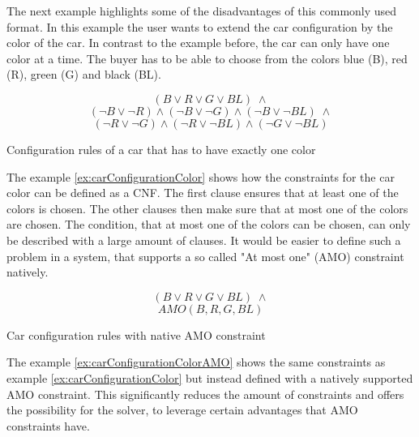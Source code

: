 The next example highlights some of the disadvantages of this commonly used format. In this example the user wants to extend the car configuration by the color of the car. In contrast to the example before, the car can only have one color at a time. The buyer has to be able to choose from the colors blue (B), red (R), green (G) and black (BL).
\begin{example}
\begin{leftbar}
\begin{displaymath}
(B \vee R \vee G \vee BL) \; \wedge
\end{displaymath}
\begin{displaymath}
(\neg B \vee \neg R) \wedge (\neg B \vee \neg G) \wedge (\neg B \vee \neg BL)\; \wedge
\end{displaymath}
\begin{displaymath}
(\neg R \vee \neg G) \wedge (\neg R \vee \neg BL) \wedge (\neg G \vee \neg BL)
\end{displaymath}
\end{leftbar}
\caption{Configuration rules of a car that has to have exactly one color}
\label{ex:carConfigurationColor}
\end{example}

The example \ref{ex:carConfigurationColor} shows how the constraints for the car color can be defined as a CNF. The first clause ensures that at least one of the colors is chosen. The other clauses then make sure that at most one of the colors are chosen. The condition, that at most one of the colors can be chosen, can only be described with a large amount of clauses. It would be easier to define such a problem in a system, that supports a so called "At most one" (AMO) constraint natively.

\begin{example}
\begin{leftbar}
\begin{displaymath}
(B \vee R \vee G \vee BL) \; \wedge
\end{displaymath}
\begin{displaymath}
AMO(B,R,G,BL)
\end{displaymath}
\end{leftbar}
\caption{Car configuration rules with native AMO constraint}
\label{ex:carConfigurationColorAMO}
\end{example}

The example \ref{ex:carConfigurationColorAMO} shows the same constraints as example \ref{ex:carConfigurationColor} but instead defined with a natively supported AMO constraint. This significantly reduces the amount of constraints and offers the possibility for the solver, to leverage certain advantages that AMO constraints have.

